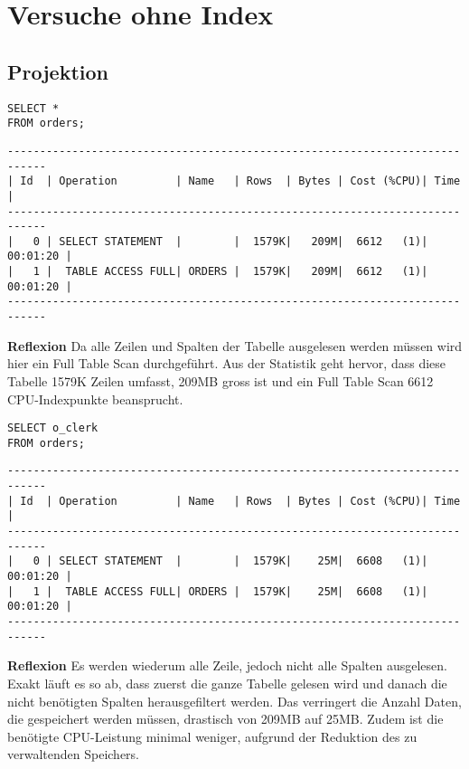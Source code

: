 \documentclass[10pt]{article}
\begin{document}
\section{Versuche ohne Index}
\subsection{Projektion}
\begin{lstlisting}[style=sql]
SELECT *
FROM orders;
\end{lstlisting}
\begin{lstlisting}[style=queryexecutionplan]
----------------------------------------------------------------------------
| Id  | Operation         | Name   | Rows  | Bytes | Cost (%CPU)| Time     |
----------------------------------------------------------------------------
|   0 | SELECT STATEMENT  |        |  1579K|   209M|  6612   (1)| 00:01:20 |
|   1 |  TABLE ACCESS FULL| ORDERS |  1579K|   209M|  6612   (1)| 00:01:20 |
---------------------------------------------------------------------------- 
\end{lstlisting}   
\textbf{Reflexion} \newline
Da alle Zeilen und Spalten der Tabelle ausgelesen werden müssen wird hier ein
Full Table Scan durchgeführt. Aus der Statistik geht hervor, dass diese Tabelle
1579K Zeilen umfasst, 209MB gross ist und ein Full Table Scan 6612 CPU-Indexpunkte
beansprucht.

\begin{lstlisting}[style=sql]
SELECT o_clerk
FROM orders;
\end{lstlisting}
\begin{lstlisting}[style=queryexecutionplan]
----------------------------------------------------------------------------
| Id  | Operation         | Name   | Rows  | Bytes | Cost (%CPU)| Time     |
----------------------------------------------------------------------------
|   0 | SELECT STATEMENT  |        |  1579K|    25M|  6608   (1)| 00:01:20 |
|   1 |  TABLE ACCESS FULL| ORDERS |  1579K|    25M|  6608   (1)| 00:01:20 |
---------------------------------------------------------------------------- 
\end{lstlisting}   
\textbf{Reflexion} \newline
Es werden wiederum alle Zeile, jedoch nicht alle Spalten ausgelesen.
Exakt läuft es so ab, dass zuerst die ganze Tabelle gelesen wird und danach die nicht
benötigten Spalten herausgefiltert werden.
Das verringert die Anzahl Daten, die gespeichert werden müssen, drastisch von 209MB auf 25MB.
Zudem ist die benötigte CPU-Leistung minimal weniger, aufgrund der Reduktion des
zu verwaltenden Speichers.
\end{document}
